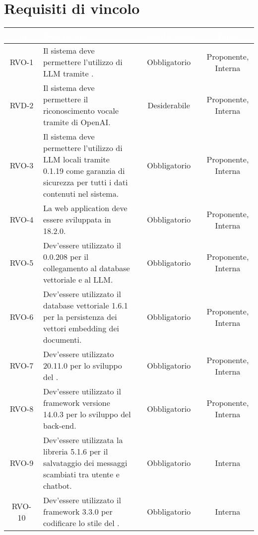 \section{Requisiti di vincolo}

\begingroup
\setlength{\tabcolsep}{10pt}
\renewcommand{\arraystretch}{1.5}
\begin{xltabular}{\textwidth}{| c | X | c | c |}
    \hline
     \textbf{\textcolor{white}{Codice}} & \textbf{\textcolor{white}{Descrizione}} & \textbf{\textcolor{white}{Classificazione}} & \textbf{\textcolor{white}{Fonte}}\\
    \hline
    \endhead
   
    RVO-1 & Il sistema deve permettere l'utilizzo di LLM tramite . & Obbligatorio & Proponente, Interna \\
    \hline
    RVD-2 & Il sistema deve permettere il riconoscimento vocale tramite  di OpenAI. & Desiderabile & Proponente, Interna \\
    \hline
    RVO-3 & Il sistema deve permettere l'utilizzo di LLM locali tramite  0.1.19 come garanzia di sicurezza per tutti i dati contenuti nel sistema. & Obbligatorio & Proponente, Interna \\
    \hline
    RVO-4 & La web application deve essere sviluppata in  18.2.0. & Obbligatorio & Proponente, Interna \\
    \hline
    RVO-5 & Dev'essere utilizzato il   0.0.208 per il collegamento al database vettoriale e al LLM. & Obbligatorio & Proponente, Interna \\
    \hline
    RVO-6 & Dev'essere utilizzato il database vettoriale  1.6.1 per la persistenza dei vettori embedding dei documenti. & Obbligatorio & Proponente, Interna \\
    \hline
    RVO-7 & Dev'essere utilizzato  20.11.0 per lo sviluppo del . & Obbligatorio & Proponente, Interna \\
    \hline
    RVO-8 & Dev'essere utilizzato il framework  versione 14.0.3 per lo sviluppo del back-end. & Obbligatorio & Proponente, Interna \\
    \hline
    RVO-9 & Dev'essere utilizzata la libreria  5.1.6 per il salvataggio dei messaggi scambiati tra utente e chatbot. & Obbligatorio & Interna \\
    \hline
    RVO-10 & Dev'essere utilizzato il framework  3.3.0 per codificare lo stile del . & Obbligatorio & Interna \\

\end{xltabular}
